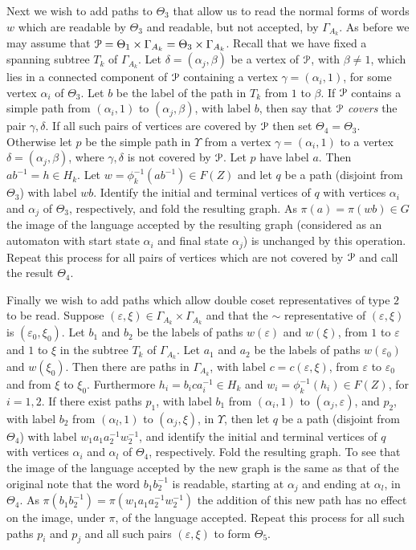 \documentclass[a4paper,12pt]{article}
\renewcommand{\a}{\alpha }
\renewcommand{\b}{\beta }
\newcommand{\G}{\Gamma }
\newcommand{\g}{\gamma }
\renewcommand{\d}{\delta }
\newcommand{\e}{\varepsilon }
\newcommand{\T}{\Theta }
\newcommand{\U}{\Upsilon }
\newcommand{\cP}{{\cal{P}}}
\numberwithin{equation}{section}
\numberwithin{figure}{section}
\begin{document}
Next we wish to add paths to $\T_3$ that allow us to read the normal
forms of words $w$ which are readable by $\T_3$ and readable,
but not accepted, by $\G_{A_k}$.
As before we may assume that
$\cP=\T_1\times \G_{A_k}=
 \T_3\times \G_{A_k}$.
Recall that we have fixed a spanning subtree
$T_k$ of $\G_{A_k}$.
Let $\d=(\a_j,\b)$ be a vertex of $\cP$, with $\b\neq 1$, which lies
in a connected component of $\cP$ containing a vertex  $\g=(\a_i,1)$,
for some vertex $\a_i$ of $\T_3$.
Let $b$ be the label of the path in $T_k$ from $1$ to $\b$.
 If $\cP$ contains a simple
path from $(\a_i,1)$ to $(\a_j,\b)$, with label $b$,  then
 say that $\cP$ {\em covers} the pair $\g,\d$.
If all such pairs of vertices are covered by $\cP$ then set $\T_4=\T_3$.
Otherwise
let $p$ be the simple path in $\U$ from a
vertex $\g=(\a_i,1)$ to a vertex $\d=(\a_j,\b)$, where $\g,\d$
is not covered by $\cP$.
 Let
$p$ have label $a$.
Then $ab^{-1}=h\in H_k$. Let
$w=\phi_{k}^{-1}(ab^{-1})
\in F(Z)$ and let $q$ be a path (disjoint from $\T_3$)
with label $wb$. Identify the initial
and terminal vertices of $q$ with vertices $\a_i$ and $\a_j$ of $\T_3$,
respectively, and fold
the resulting graph.
As $\pi(a)=\pi(wb)\in G$ the image of the language accepted by
the resulting graph (considered as an automaton with start state  $\a_i$
 and final
state $\a_j$) is unchanged by
this operation.
Repeat this process for all pairs of  vertices which are not
covered by $\cP$ and
call the result $\T_4$.

Finally we wish to add paths which allow double coset representatives
of type $2$ to be read. Suppose $(\e,\xi)\in \G_{A_k}\times \G_{A_k}$ and
that the $\sim$ representative of $(\e,\xi)$ is $(\e_0,\xi_0)$.
Let $b_1$ and $b_2$ be the labels
of paths $w(\e)$ and $w(\xi)$, from $1$ to $\e$ and $1$ to $\xi$ in the
subtree $T_k$ of $\G_{A_k}$. Let $a_1$ and $a_2$ be the labels of
paths $w(\e_0)$ and $w(\xi_0)$. Then there are  paths in $\G_{A_k}$,
with label
$c=c(\e,\xi)$, from $\e$ to $\e_0$ and from $\xi$ to $\xi_0$.
Furthermore $h_i=
b_ica_i^{-1}\in H_k$ and $w_i=\phi_k^{-1}(h_i)\in F(Z)$, for $i=1,2$.
If there
exist paths $p_1$, with label $b_1$ from $(\a_i,1)$ to $(\a_j,\e)$,
and $p_2$, with label $b_2$ from
$(\a_l,1)$ to $(\a_j,\xi)$, in $\U$,  then
let $q$ be a path (disjoint from $\T_4$)
with label $w_1 a_1a_2^{-1} w_2^{-1}$,
and identify the initial
and terminal vertices of $q$ with  vertices $\a_i$ and $\a_l$
of $\T_4$, respectively.
Fold the resulting graph.
To see that the image of the language accepted by
 the new graph is the same as that of the original note
that the word $b_1b_2^{-1}$ is readable, starting at $\a_j$ and
ending at $\a_l$, in $\T_4$. As $\pi(b_1b_2^{-1})=\pi(w_1a_1a_2^{-1}w_2^{-1})$
the addition of this new path has no effect on the image, under $\pi$, of
the language accepted.
Repeat this process for all such paths $p_i$ and $p_j$ and all such
pairs $(\e,\xi)$ to form $\T_5$.
\end{document}
